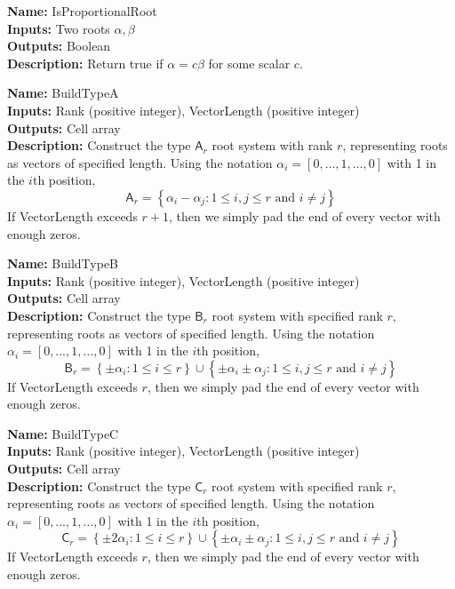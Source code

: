 \documentclass[12pt]{article}
\theoremstyle{definition}
\numberwithin{theorem}{subsection}
\newcommand{\lb}{\left\{}
\newcommand{\rb}{\right\}}
\newcommand{\tbf}{\textbf}
\newcommand{\noi}{\noindent}
\begin{document}
\begin{framed}
\noi \tbf{Name:} IsProportionalRoot \\
\noi \tbf{Inputs:} Two roots $\alpha, \beta$ \\
\noi \tbf{Outputs:} Boolean \\
\noi \tbf{Description:} Return true if $\alpha = c \beta$ for some scalar $c$.
\end{framed}

\begin{framed}
\noi \tbf{Name:} BuildTypeA \\
\noi \tbf{Inputs:} Rank (positive integer), VectorLength (positive integer) \\
\noi \tbf{Outputs:} Cell array \\
\noi \tbf{Description:} Construct the type $\mathsf{A}_r$ root system with rank $r$, representing roots as vectors of specified length. Using the notation $\alpha_i = [0, \ldots, 1, \ldots, 0]$ with 1 in the $i$th position,
\[
	\mathsf{A}_r = \lb \alpha_i - \alpha_j : 1 \le i, j \le r \text{ and } i \neq j \rb
\]
If VectorLength exceeds $r + 1$, then we simply pad the end of every vector with enough zeros.
\end{framed}

\begin{framed}
\noi \tbf{Name:} BuildTypeB \\
\noi \tbf{Inputs:} Rank (positive integer), VectorLength (positive integer) \\
\noi \tbf{Outputs:} Cell array  \\
\noi \tbf{Description:} Construct the type $\mathsf{B}_r$ root system with specified rank $r$, representing roots as vectors of specified length. Using the notation $\alpha_i = [0, \ldots, 1, \ldots, 0]$ with 1 in the $i$th position,
\[
	\mathsf{B}_r = \lb \pm \alpha_i : 1 \le i \le r \rb \cup \lb \pm \alpha_i \pm \alpha_j : 1 \le i, j \le r \text{ and } i \neq j \rb
\]
If VectorLength exceeds $r$, then we simply pad the end of every vector with enough zeros.
\end{framed}

\begin{framed}
\noi \tbf{Name:} BuildTypeC \\
\noi \tbf{Inputs:} Rank (positive integer), VectorLength (positive integer) \\
\noi \tbf{Outputs:} Cell array  \\
\noi \tbf{Description:} Construct the type $\mathsf{C}_r$ root system with specified rank $r$, representing roots as vectors of specified length. Using the notation $\alpha_i = [0, \ldots, 1, \ldots, 0]$ with 1 in the $i$th position,
\[
	\mathsf{C}_r = \lb \pm 2 \alpha_i : 1 \le i \le r \rb \cup \lb \pm \alpha_i \pm \alpha_j : 1 \le i, j \le r \text{ and } i \neq j \rb
\]
If VectorLength exceeds $r$, then we simply pad the end of every vector with enough zeros.
\end{framed}
\end{document}
